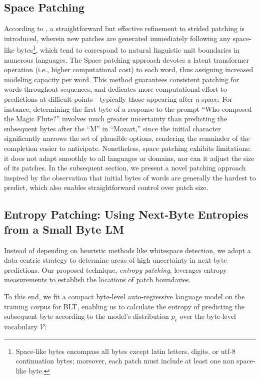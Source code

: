 \subsection{Space Patching}
\label{section:white-patch}

According to \citet{slagle2024spacebyte}, a straightforward but effective refinement to strided patching is introduced, wherein new patches are generated immediately following any space-like bytes\footnote{
    Space-like bytes encompass all bytes except latin letters, digits, or utf-8 continuation bytes; moreover, each patch must include at least one non space-like byte.}, which tend to correspond to natural linguistic unit boundaries in numerous languages. The Space patching approach devotes a latent transformer operation (i.e., higher computational cost) to each word, thus assigning increased modeling capacity per word. This method guarantees consistent patching for words throughout sequences, and dedicates more computational effort to predictions at difficult points—typically those appearing after a space. For instance, determining the first byte of a response to the prompt ``Who composed the Magic Flute?\uline{\hspace{.6em}}'' involves much greater uncertainty than predicting the subsequent bytes after the ``M'' in ``Mozart,'' since the initial character significantly narrows the set of plausible options, rendering the remainder of the completion easier to anticipate. Nonetheless, space patching exhibits limitations: it does not adapt smoothly to all languages or domains, nor can it adjust the size of its patches. In the subsequent section, we present a novel patching approach inspired by the observation that initial bytes of words are generally the hardest to predict, which also enables straightforward control over patch size.

\subsection{Entropy Patching: Using Next-Byte Entropies from a Small Byte LM}
\label{section:dyn-patch}

Instead of depending on heuristic methods like whitespace detection, we adopt a data-centric strategy to determine areas of high uncertainty in next-byte predictions. Our proposed technique, \textit{entropy patching}, leverages entropy measurements to establish the locations of patch boundaries.

To this end, we fit a compact byte-level auto-regressive language model on the training corpus for {\textsc BLT}, enabling us to calculate the entropy of predicting the subsequent byte according to the model’s distribution $p_{e}$ over the byte-level vocabulary $\mathcal{V}$:


